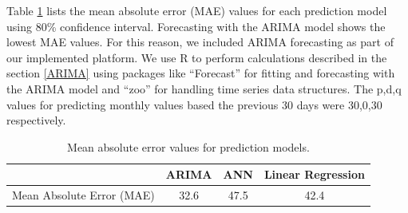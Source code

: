 Table \ref{tab:mae} lists the mean absolute error (MAE) values for each prediction model using 80\% confidence interval. Forecasting with the ARIMA model shows the lowest MAE values. For this reason, we included ARIMA forecasting as part of our implemented platform. We use R to perform calculations described in the section \ref{ARIMA} using packages like ``Forecast'' for fitting and forecasting with the ARIMA model and ``zoo'' for handling time series data structures. The p,d,q values for predicting monthly values based the previous 30 days were 30,0,30 respectively.

\begin{center}
\begin{table}[!ht] 
\begin{tabular} { | l | c | c | c | } 

\hline
	 & ARIMA & ANN & Linear Regression \\ \hline
	Mean Absolute Error (MAE) & 32.6 & 47.5 & 42.4 \\ \hline
\end{tabular}
\caption{Mean absolute error values for prediction models.}
\label{tab:mae}
\end{table}
\end{center}

  